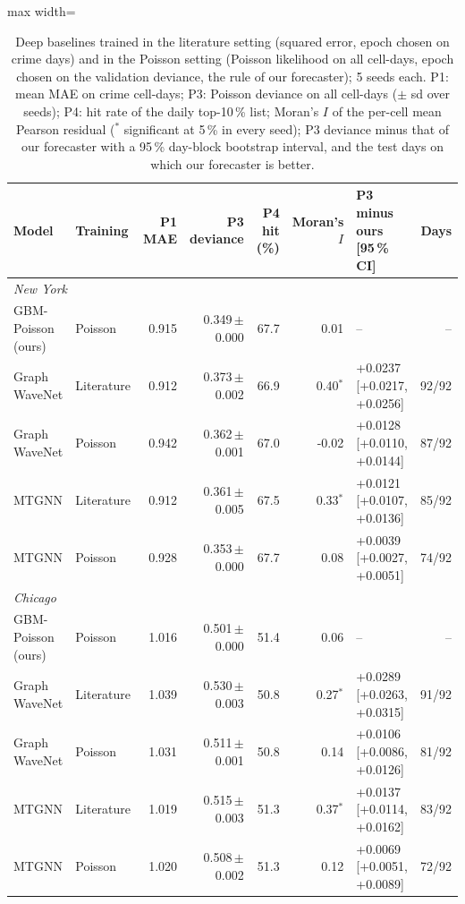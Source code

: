 \begin{table}[!htbp]\centering\scriptsize\setlength{\tabcolsep}{3pt}
\caption{Deep baselines trained in the literature setting (squared error, epoch chosen on crime days) and in the Poisson setting (Poisson likelihood on all cell-days, epoch chosen on the validation deviance, the rule of our forecaster); 5 seeds each. P1: mean MAE on crime cell-days; P3: Poisson deviance on all cell-days ($\pm$ sd over seeds); P4: hit rate of the daily top-10\,\% list; Moran's $I$ of the per-cell mean Pearson residual ($^{*}$ significant at 5\,\% in every seed); P3 deviance minus that of our forecaster with a 95\,\% day-block bootstrap interval, and the test days on which our forecaster is better.}\label{tab:poisson}
\begin{adjustbox}{max width=\linewidth}\begin{tabular}{llrrrrlr}\toprule
Model & Training & P1 MAE & P3 deviance & P4 hit (\%) & Moran's $I$ & P3 minus ours [95\,\% CI] & Days\\\midrule
\multicolumn{8}{l}{\textit{New York}}\\
GBM-Poisson (ours) & Poisson & 0.915 & 0.349\,{\tiny$\pm$0.000} & 67.7 & 0.01 & -- & -- \\
Graph WaveNet & Literature & 0.912 & 0.373\,{\tiny$\pm$0.002} & 66.9 & 0.40$^{*}$ & +0.0237 [+0.0217, +0.0256] & 92/92 \\
Graph WaveNet & Poisson & 0.942 & 0.362\,{\tiny$\pm$0.001} & 67.0 & -0.02 & +0.0128 [+0.0110, +0.0144] & 87/92 \\
MTGNN & Literature & 0.912 & 0.361\,{\tiny$\pm$0.005} & 67.5 & 0.33$^{*}$ & +0.0121 [+0.0107, +0.0136] & 85/92 \\
MTGNN & Poisson & 0.928 & 0.353\,{\tiny$\pm$0.000} & 67.7 & 0.08 & +0.0039 [+0.0027, +0.0051] & 74/92 \\
\midrule
\multicolumn{8}{l}{\textit{Chicago}}\\
GBM-Poisson (ours) & Poisson & 1.016 & 0.501\,{\tiny$\pm$0.000} & 51.4 & 0.06 & -- & -- \\
Graph WaveNet & Literature & 1.039 & 0.530\,{\tiny$\pm$0.003} & 50.8 & 0.27$^{*}$ & +0.0289 [+0.0263, +0.0315] & 91/92 \\
Graph WaveNet & Poisson & 1.031 & 0.511\,{\tiny$\pm$0.001} & 50.8 & 0.14 & +0.0106 [+0.0086, +0.0126] & 81/92 \\
MTGNN & Literature & 1.019 & 0.515\,{\tiny$\pm$0.003} & 51.3 & 0.37$^{*}$ & +0.0137 [+0.0114, +0.0162] & 83/92 \\
MTGNN & Poisson & 1.020 & 0.508\,{\tiny$\pm$0.002} & 51.3 & 0.12 & +0.0069 [+0.0051, +0.0089] & 72/92 \\
\bottomrule\end{tabular}\end{adjustbox}\end{table}
